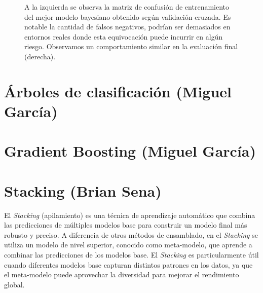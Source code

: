 \documentclass[12pt,letterpaper]{article}
\begin{document}
\begin{figure}[!ht]
\centering
{}
\caption{A la izquierda se observa la matriz de confusión de entrenamiento del mejor modelo bayesiano obtenido según validación cruzada. Es notable la cantidad de falsos negativos, podrían ser demasiados en entornos reales donde esta equivocación puede incurrir en algún riesgo.
Observamos un comportamiento similar en la evaluación final (derecha). }
\label{fig:BayesMatrix}
\end{figure}


\section{Árboles de clasificación (Miguel García)}
\section{Gradient Boosting (Miguel García)}
\section{Stacking (Brian Sena)}
El \textit{Stacking} (apilamiento) es una técnica de aprendizaje automático que combina las predicciones de múltiples modelos base para construir un modelo final más robusto y preciso. 
A diferencia de otros métodos de ensamblado, en el \textit{Stacking} se utiliza un modelo de nivel superior, conocido como meta-modelo, que aprende a combinar las predicciones de los modelos base.
El \textit{Stacking} es particularmente útil cuando diferentes modelos base capturan distintos patrones en los datos, ya que el meta-modelo puede aprovechar la diversidad para mejorar el rendimiento global. 
\end{document}
